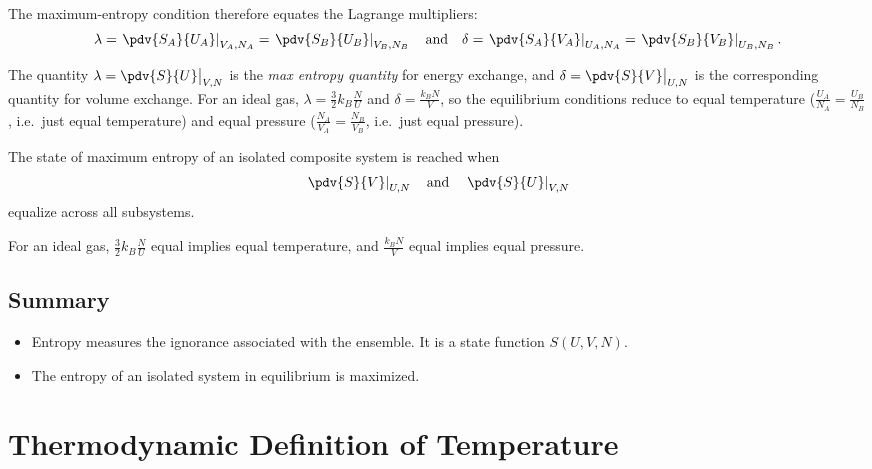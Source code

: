 The maximum-entropy condition therefore equates the Lagrange multipliers:
\begin{equation}
    \lambda = \left.\pdv{S_A}{U_A}\right|_{V_A,N_A} = \left.\pdv{S_B}{U_B}\right|_{V_B,N_B}
    \quad\text{and}\quad
    \delta = \left.\pdv{S_A}{V_A}\right|_{U_A,N_A} = \left.\pdv{S_B}{V_B}\right|_{U_B,N_B}.
\end{equation}

The quantity $\lambda = \pdv{S}{U}\big|_{V,N}$ is the \emph{max entropy quantity} for energy exchange, and $\delta = \pdv{S}{V}\big|_{U,N}$ is the corresponding quantity for volume exchange. For an ideal gas, $\lambda = \frac{3}{2}k_B\frac{N}{U}$ and $\delta = \frac{k_B N}{V}$, so the equilibrium conditions reduce to equal temperature ($\frac{U_A}{N_A} = \frac{U_B}{N_B}$, i.e.\ just equal temperature) and equal pressure ($\frac{N_A}{V_A} = \frac{N_B}{V_B}$, i.e.\ just equal pressure).


\begin{theorem}
The state of maximum entropy of an isolated composite system is reached when
\begin{equation}
    \left.\pdv{S}{V}\right|_{U,N} \quad\text{and}\quad \left.\pdv{S}{U}\right|_{V,N}
\end{equation}
equalize across all subsystems.
\end{theorem}

For an ideal gas, $\frac{3}{2}k_B\frac{N}{U}$ equal implies equal temperature, and $\frac{k_B N}{V}$ equal implies equal pressure.

\subsection*{Summary}

\begin{itemize}
    \item Entropy measures the ignorance associated with the ensemble. It is a state function $S(U, V, N)$.
    \item The entropy of an isolated system in equilibrium is maximized.
\end{itemize}


\section{Thermodynamic Definition of Temperature}

